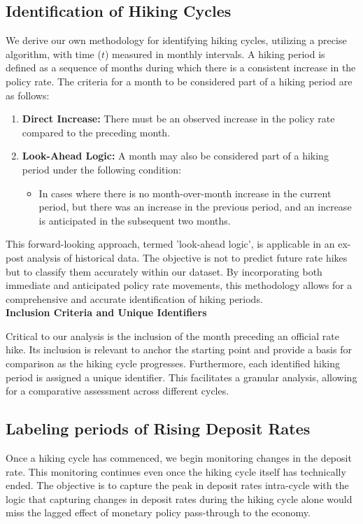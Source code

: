 \documentclass{article}
\begin{document}
\subsection{Identification of Hiking Cycles}

We derive our own methodology for identifying hiking cycles, utilizing a precise algorithm, with time (\( t \)) measured in monthly intervals. A hiking period is defined as a sequence of months during which there is a consistent increase in the policy rate. The criteria for a month to be considered part of a hiking period are as follows:

\begin{enumerate}
    \item \textbf{Direct Increase:} There must be an observed increase in the policy rate compared to the preceding month.
    
    \item \textbf{Look-Ahead Logic:} A month may also be considered part of a hiking period under the following condition:
    \begin{itemize}
        \item In cases where there is no month-over-month increase in the current period, but there was an increase in the previous period, and an increase is anticipated in the subsequent two months.
    \end{itemize}
\end{enumerate}

This forward-looking approach, termed 'look-ahead logic', is applicable in an ex-post analysis of historical data. The objective is not to predict future rate hikes but to classify them accurately within our dataset. By incorporating both immediate and anticipated policy rate movements, this methodology allows for a comprehensive and accurate identification of hiking periods.\\

\textbf{Inclusion Criteria and Unique Identifiers}

Critical to our analysis is the inclusion of the month preceding an official rate hike. Its inclusion is relevant to anchor the starting point and provide a basis for comparison as the hiking cycle progresses. Furthermore, each identified hiking period is assigned a unique identifier. This facilitates a granular analysis, allowing for a comparative assessment across different cycles.

\subsection{Labeling periods of Rising Deposit Rates}
Once a hiking cycle has commenced, we begin monitoring changes in the deposit rate. This monitoring continues even once the hiking cycle itself has technically ended. The objective is to capture the peak in deposit rates intra-cycle with the logic that capturing changes in deposit rates during the hiking cycle alone would miss the lagged effect of monetary policy pass-through to the economy.
\end{document}
